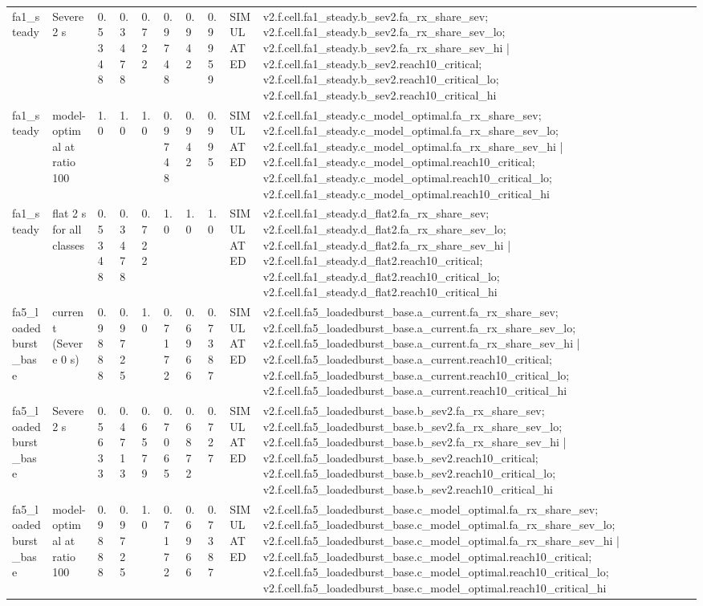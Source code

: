 \begin{table}[t]
\begin{tabular}{llllllllll}
fa1\_steady & Severe 2 s & 0.5348 & 0.3478 & 0.722 & 0.9748 & 0.942 & 0.9959 & SIMULATED & v2.f.cell.fa1\_steady.b\_sev2.fa\_rx\_share\_sev; v2.f.cell.fa1\_steady.b\_sev2.fa\_rx\_share\_sev\_lo; v2.f.cell.fa1\_steady.b\_sev2.fa\_rx\_share\_sev\_hi | v2.f.cell.fa1\_steady.b\_sev2.reach10\_critical; v2.f.cell.fa1\_steady.b\_sev2.reach10\_critical\_lo; v2.f.cell.fa1\_steady.b\_sev2.reach10\_critical\_hi \\
fa1\_steady & model-optimal at ratio 100 & 1.0 & 1.0 & 1.0 & 0.9748 & 0.942 & 0.995 & SIMULATED & v2.f.cell.fa1\_steady.c\_model\_optimal.fa\_rx\_share\_sev; v2.f.cell.fa1\_steady.c\_model\_optimal.fa\_rx\_share\_sev\_lo; v2.f.cell.fa1\_steady.c\_model\_optimal.fa\_rx\_share\_sev\_hi | v2.f.cell.fa1\_steady.c\_model\_optimal.reach10\_critical; v2.f.cell.fa1\_steady.c\_model\_optimal.reach10\_critical\_lo; v2.f.cell.fa1\_steady.c\_model\_optimal.reach10\_critical\_hi \\
fa1\_steady & flat 2 s for all classes & 0.5348 & 0.3478 & 0.722 & 1.0 & 1.0 & 1.0 & SIMULATED & v2.f.cell.fa1\_steady.d\_flat2.fa\_rx\_share\_sev; v2.f.cell.fa1\_steady.d\_flat2.fa\_rx\_share\_sev\_lo; v2.f.cell.fa1\_steady.d\_flat2.fa\_rx\_share\_sev\_hi | v2.f.cell.fa1\_steady.d\_flat2.reach10\_critical; v2.f.cell.fa1\_steady.d\_flat2.reach10\_critical\_lo; v2.f.cell.fa1\_steady.d\_flat2.reach10\_critical\_hi \\
fa5\_loadedburst\_base & current (Severe 0 s) & 0.9888 & 0.9725 & 1.0 & 0.7172 & 0.6966 & 0.7387 & SIMULATED & v2.f.cell.fa5\_loadedburst\_base.a\_current.fa\_rx\_share\_sev; v2.f.cell.fa5\_loadedburst\_base.a\_current.fa\_rx\_share\_sev\_lo; v2.f.cell.fa5\_loadedburst\_base.a\_current.fa\_rx\_share\_sev\_hi | v2.f.cell.fa5\_loadedburst\_base.a\_current.reach10\_critical; v2.f.cell.fa5\_loadedburst\_base.a\_current.reach10\_critical\_lo; v2.f.cell.fa5\_loadedburst\_base.a\_current.reach10\_critical\_hi \\
fa5\_loadedburst\_base & Severe 2 s & 0.5633 & 0.4713 & 0.6579 & 0.7065 & 0.6872 & 0.727 & SIMULATED & v2.f.cell.fa5\_loadedburst\_base.b\_sev2.fa\_rx\_share\_sev; v2.f.cell.fa5\_loadedburst\_base.b\_sev2.fa\_rx\_share\_sev\_lo; v2.f.cell.fa5\_loadedburst\_base.b\_sev2.fa\_rx\_share\_sev\_hi | v2.f.cell.fa5\_loadedburst\_base.b\_sev2.reach10\_critical; v2.f.cell.fa5\_loadedburst\_base.b\_sev2.reach10\_critical\_lo; v2.f.cell.fa5\_loadedburst\_base.b\_sev2.reach10\_critical\_hi \\
fa5\_loadedburst\_base & model-optimal at ratio 100 & 0.9888 & 0.9725 & 1.0 & 0.7172 & 0.6966 & 0.7387 & SIMULATED & v2.f.cell.fa5\_loadedburst\_base.c\_model\_optimal.fa\_rx\_share\_sev; v2.f.cell.fa5\_loadedburst\_base.c\_model\_optimal.fa\_rx\_share\_sev\_lo; v2.f.cell.fa5\_loadedburst\_base.c\_model\_optimal.fa\_rx\_share\_sev\_hi | v2.f.cell.fa5\_loadedburst\_base.c\_model\_optimal.reach10\_critical; v2.f.cell.fa5\_loadedburst\_base.c\_model\_optimal.reach10\_critical\_lo; v2.f.cell.fa5\_loadedburst\_base.c\_model\_optimal.reach10\_critical\_hi \\

\end{tabular}
\end{table}
